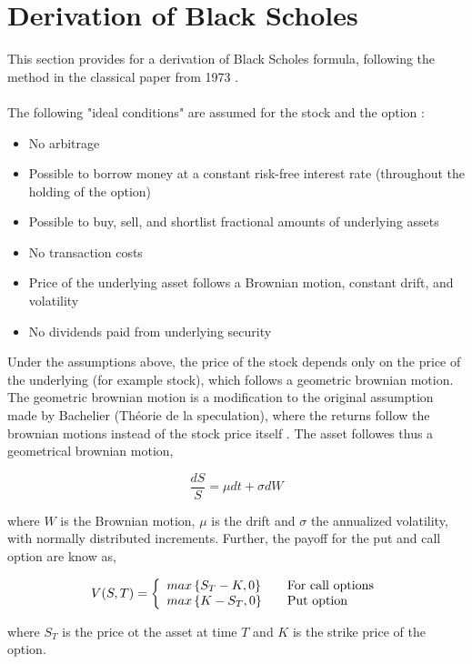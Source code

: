 \documentclass[11pt,a4paper]{article}
\numberwithin{equation}{section}
\begin{document}
\section{Derivation of Black Scholes} \label{app:derivbs}
This section provides for a derivation of Black Scholes formula, following the method in the classical paper from 1973 \cite{blackscholes}.
\\\\
The following "ideal conditions" are assumed for the stock and the option \cite{blackscholes}\cite{astborg:fsharp}:
\begin{itemize}
\item No arbitrage
\item Possible to borrow money at a constant risk-free interest rate (throughout the
holding of the option)
\item Possible to buy, sell, and shortlist fractional amounts of underlying assets
\item No transaction costs
\item Price of the underlying asset follows a Brownian motion, constant drift,
and volatility
\item No dividends paid from underlying security
\end{itemize}

Under the assumptions above, the price of the stock depends only on the price of the underlying (for example stock), which follows
a geometric brownian motion. The geometric brownian motion is a modification to the original assumption made by Bachelier (Théorie de la speculation), where
the returns follow the brownian motions instead of the stock price itself \cite{bachelier}. The asset followes thus a geometrical brownian motion,

\[
\frac{dS}{S} = \mu dt + \sigma dW
\]

where $W$ is the Brownian motion, $\mu$ is the drift and $\sigma$ the annualized volatility, with normally distributed increments. Further, the payoff for the put and call option are know as,

\[ V(S,T) = \left\{
  \begin{array}{l l}
    max\left\{S_T-K,0 \right\} & \quad \text{For call options} \\
    max\left\{K-S_T,0 \right\} & \quad \text{Put option}
  \end{array} \right.\]

where $S_T$ is the price ot the asset at time $T$ and $K$ is the strike price of the option.
\end{document}
